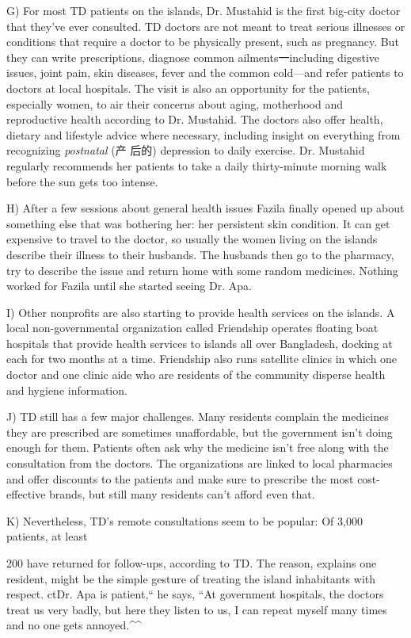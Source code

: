 \documentclass[UTF8,11pt]{ctexart}
\begin{document}
G) For most TD patients on the islands, Dr. Mustahid is the first big-city doctor that they've ever consulted. TD doctors are not meant to treat serious illnesses or conditions that require a doctor to be physically present, such as pregnancy. But they can write prescriptions, diagnose common ailments一including digestive issues, joint pain, skin diseases, fever and the common cold—and refer patients to doctors at local hospitals. The visit is also an opportunity for the patients, especially women, to air their concerns about aging, motherhood and reproductive health according to Dr. Mustahid. The doctors also offer health, dietary and lifestyle advice where necessary, including insight on everything from recognizing \textit{postnatal} (产 后的) depression to daily exercise. Dr. Mustahid regularly recommends her patients to take a daily thirty-minute morning walk before the sun gets too intense.


H) After a few sessions about general health issues Fazila finally opened up about something else that was bothering her: her persistent skin condition. It can get expensive to travel to the doctor, so usually the women living on the islands describe their illness to their husbands. The husbands then go to the pharmacy, try to describe the issue and return home with some random medicines. Nothing worked for Fazila until she started seeing Dr. Apa.


I) Other nonprofits are also starting to provide health services on the islands. A local non-governmental organization called Friendship operates floating boat hospitals that provide health services to islands all over Bangladesh, docking at each for two months at a time. Friendship also runs satellite clinics in which one doctor and one clinic aide who are residents of the community disperse health and hygiene information.


J) TD still has a few major challenges. Many residents complain the medicines they are prescribed are sometimes unaffordable, but the government isn't doing enough for them. Patients often ask why the medicine isn't free along with the consultation from the doctors. The organizations are linked to local pharmacies and offer discounts to the patients and make sure to prescribe the most cost-effective brands, but still many residents can't afford even that.


K) Nevertheless, TD's remote consultations seem to be popular: Of 3,000 patients, at least


200 have returned for follow-ups, according to TD. The reason, explains one resident, might be the simple gesture of treating the island inhabitants with respect. ctDr. Apa is patient,“ he says, “At government hospitals, the doctors treat us very badly, but here they listen to us, I can repeat myself many times and no one gets annoyed.\textasciicircum{}\textasciicircum{}
\end{document}
